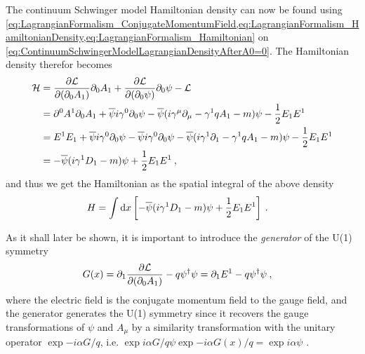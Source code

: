 \documentclass[../main.tex]{subfiles} %
\begin{document}
The continuum Schwinger model Hamiltonian density can now be found using \cref{eq:LagrangianFormalism_ConjugateMomentumField,eq:LagrangianFormalism_HamiltonianDensity,eq:LagrangianFormalism_Hamiltonian} on \cref{eq:ContinuumSchwingerModelLagrangianDensityAfterA0=0}. The Hamiltonian density therefor becomes
\begin{align} \label{eq:ContinuumSchwingerModelHamiltonianDensity}
\begin{split}
    \mathcal{H} &= \pdv{\mathcal{L}}{(\partial_0 A_1)} \partial_0 A_1 + \pdv{\mathcal{L}}{(\partial_0 \psi)} \partial_0 \psi - \mathcal{L} \\
        &= \partial^0 A^1 \partial_0 A_1 + \overline{\psi} i \gamma^0 \partial_0 \psi - \overline{\psi} (i \gamma^\mu \partial_\mu - \gamma^1 q A_1 - m) \psi - \frac{1}{2} E_1 E^1 \\
        &= E^1 E_1 + \overline{\psi} i \gamma^0 \partial_0 \psi - \overline{\psi} i \gamma^0 \partial_0 \psi - \overline{\psi} (i \gamma^1 \partial_1 - \gamma^1 q A_1 - m) \psi - \frac{1}{2} E_1 E^1 \\
        &= - \overline{\psi} (i \gamma^1 D_1 - m) \psi + \frac{1}{2} E_1 E^1 \: ,
\end{split}
\end{align}
and thus we get the Hamiltonian as the spatial integral of the above density
\begin{align} \label{eq:ContinuumSchwingerModelHamiltonian}
    H &= \int \dd{x} \left[ - \overline{\psi} (i \gamma^1 D_1 - m) \psi + \frac{1}{2} E_1 E^1 \right] \: .
\end{align}

As it shall later be shown, it is important to introduce the \emph{generator} of the U(1) symmetry
\begin{align} \label{eq:GeneratorU(1)SymmetryContinuum}
    G(x) &= \partial_1 \pdv{\L}{(\partial_0 A_1)} - q \psi\dagger \psi
        = \partial_1 E^1 - q \psi\dagger \psi \: ,
\end{align}
where the electric field is the conjugate momentum field to the gauge field, and the generator generates the U(1) symmetry since it recovers the gauge transformations of $\psi$ and $A_\mu$ by a similarity transformation with the unitary operator $\exp{-i\alpha G/q}$, i.e. $\exp{i\alpha G/q} \psi \exp{-i\alpha G(x)/q} = \exp{i\alpha}\psi$ \cite{panyella_masterThesis_2019}.
\end{document}
